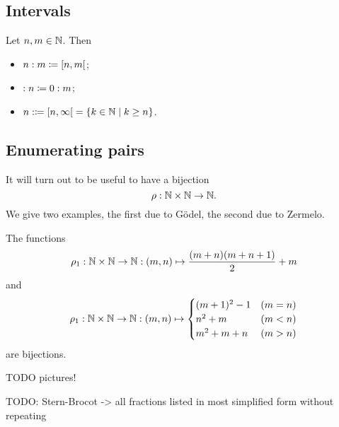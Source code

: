 \subsection{Intervals}
\begin{definition}
Let $n,m\in \mathbb{N}$. Then
\begin{itemize}
\item $n:m \defeq \interval[co]{n,m}$;
\item $:n \coloneqq 0:m$;
\item $n: \defeq \interval[co]{n,\infty} = \setbuilder{k\in \N}{k\geq n}$.
\end{itemize}
\end{definition}

\subsection{Enumerating pairs}
It will turn out to be useful to have a bijection
\[ \rho: \mathbb{N}\times \mathbb{N} \to \mathbb{N}. \]
We give two examples, the first due to Gödel, the second due to Zermelo.
\begin{lemma} \label{pairEnumeration}
The functions
\[\rho_1 : \mathbb{N}\times\mathbb{N} \to \mathbb{N}: (m,n)\mapsto \frac{(m+n)(m+n+1)}{2}+m \]
and
\[ \rho_1 : \mathbb{N}\times\mathbb{N} \to \mathbb{N}: (m,n)\mapsto \begin{cases}
(m+1)^2-1 & (m=n) \\
n^2 + m & (m<n) \\
m^2+m+n & (m>n)
\end{cases} \]
are bijections.
\end{lemma}
TODO pictures!

TODO: Stern-Brocot -> all fractions listed in most simplified form without repeating

